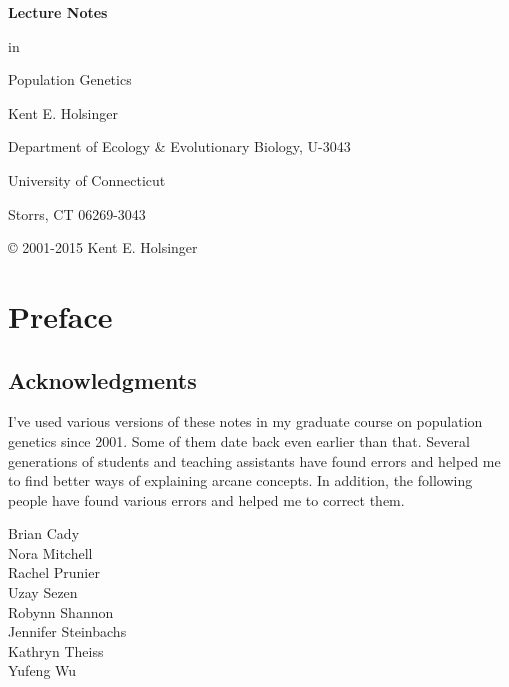 \documentclass[12pt,titlepage,openright]{book}
\begin{document}
\begin{titlepage}

{\Large\bf \noindent Lecture Notes

\noindent in

\noindent Population Genetics

}

\vfill

{\noindent Kent E. Holsinger

\noindent Department of Ecology \& Evolutionary Biology, U-3043

\noindent University of Connecticut

\noindent Storrs, CT  06269-3043}

\vfill

\end{titlepage}


{\small\noindent \copyright{} 2001-2015 Kent E. Holsinger

\ccLicense}

\tableofcontents

\chapter*{Preface}

\section*{Acknowledgments}

I've used various versions of these notes in my graduate course on
population genetics
since 2001. Some of them date back even earlier than that. Several
generations of students and teaching assistants have found errors and
helped me to find better ways of explaining arcane concepts. In
addition, the following people have found various errors and helped me
to correct them.

\begin{multicols}{2}
\noindent Brian Cady \\
Nora Mitchell \\
Rachel Prunier \\
Uzay Sezen \\
Robynn Shannon \\
Jennifer Steinbachs \\
Kathryn Theiss \\
Yufeng Wu \\
\end{multicols}
\end{document}
